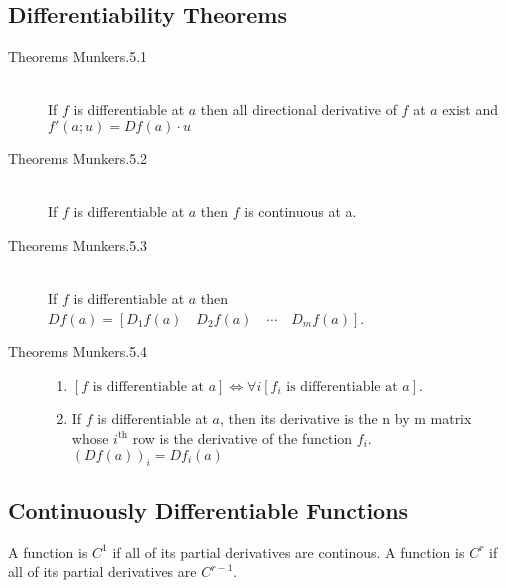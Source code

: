 \subsection{Differentiability Theorems}
\begin{description}
	\item[Theorems Munkers.5.1] \hfill \\
		If $f$ is differentiable at $a$ then all directional
		derivative of $f$ at $a$ exist and
		$f'(a;u)=Df(a)\cdot u$

	\item[Theorems Munkers.5.2] \hfill \\
		If $f$ is differentiable at $a$ then $f$ is continuous at a.

	\item[Theorems Munkers.5.3] \hfill \\
		If $f$ is differentiable at $a$
		then $Df(a)=[D_1f(a) \quad D_2f(a) \quad \cdots \quad D_mf(a)]$.

	\item[Theorems Munkers.5.4] \hfill
	\begin{enumerate}
		\renewcommand{\labelenumi}{\alph{enumi}.}
		\item
		$[f \textrm{ is differentiable at } a ]
			\Leftrightarrow
			\forall i [f_i \textrm{ is differentiable at } a]$.

		\item
		If $f$ is differentiable at $a$, then its derivative is the n by m
		matrix whose $i^\textrm{th}$ row is the derivative of the function $f_i$. $(Df(a))_{i} = Df_i(a)$
	\end{enumerate}
\end{description}

\subsection{Continuously Differentiable Functions}

A function is $C^1$ if all of its partial derivatives are continous.
A function is $C^r$ if all of its partial derivatives are $C^{r-1}$.

